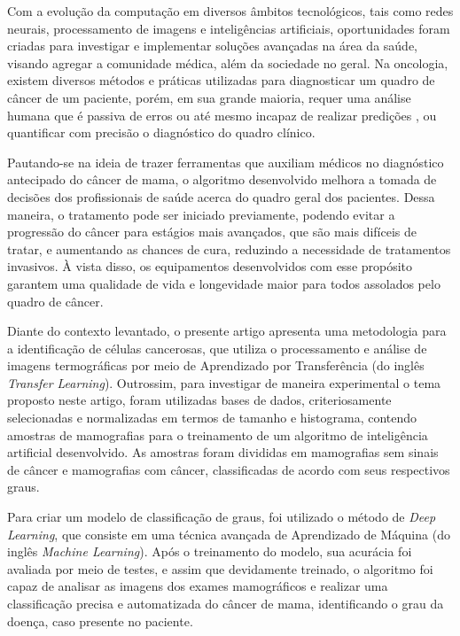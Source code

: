 Com a evolução da computação em diversos âmbitos tecnológicos, tais como redes neurais, processamento de imagens e inteligências artificiais, oportunidades foram criadas para investigar e implementar soluções avançadas na área da saúde, visando agregar a comunidade médica, além da sociedade no geral. Na oncologia, existem diversos métodos e práticas utilizadas para diagnosticar um quadro de câncer de um paciente, porém, em sua grande maioria, requer uma análise humana que é passiva de erros ou até mesmo incapaz de realizar predições , ou quantificar com precisão o diagnóstico do quadro clínico.

Pautando-se na ideia de trazer ferramentas que auxiliam médicos no diagnóstico antecipado do câncer de mama, o algoritmo desenvolvido melhora a tomada de decisões dos profissionais de saúde acerca do quadro geral dos pacientes. Dessa maneira, o tratamento pode ser iniciado previamente, podendo evitar a progressão do câncer para estágios mais avançados, que são mais difíceis de tratar, e aumentando as chances de cura, reduzindo a necessidade de tratamentos invasivos. À vista disso, os equipamentos desenvolvidos com esse propósito garantem uma qualidade de vida e longevidade maior para todos assolados pelo quadro de câncer.

Diante do contexto levantado, o presente artigo apresenta uma metodologia para a identificação de células cancerosas, que utiliza o processamento e análise de imagens termográficas por meio de Aprendizado por Transferência (do inglês \textit{Transfer Learning}). Outrossim, para investigar de maneira experimental o tema proposto neste artigo, foram utilizadas bases de dados, criteriosamente selecionadas e normalizadas em termos de tamanho e histograma, contendo amostras de mamografias para o treinamento de um algoritmo de inteligência artificial desenvolvido. As amostras foram divididas em mamografias sem sinais de câncer e mamografias com câncer, classificadas de acordo com seus respectivos graus.

Para criar um modelo de classificação de graus, foi utilizado o método de \textit{Deep Learning}, que consiste em uma técnica avançada de Aprendizado de Máquina (do inglês \textit{Machine Learning}). Após o treinamento do modelo, sua acurácia foi avaliada por meio de testes, e assim que devidamente treinado, o algoritmo foi capaz de analisar as imagens dos exames mamográficos e realizar uma classificação precisa e automatizada do câncer de mama, identificando o grau da doença, caso presente no paciente.




